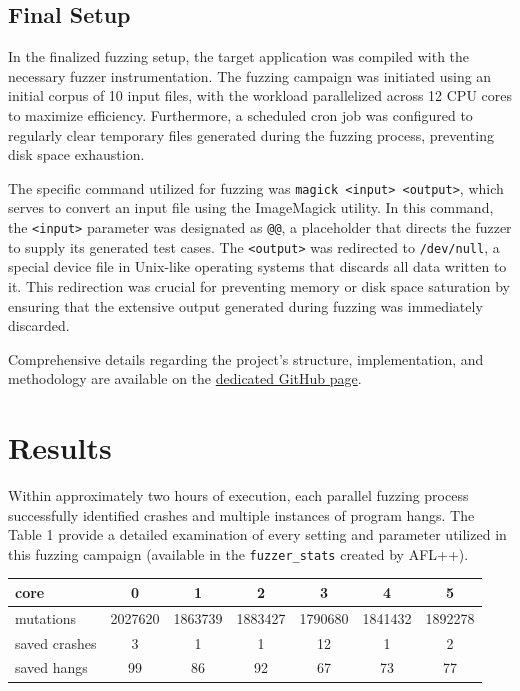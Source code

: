 \documentclass[a4paper,10pt]{article}
\begin{document}
\subsection{Final Setup}

In the finalized fuzzing setup, the target application was compiled with the necessary fuzzer instrumentation. The fuzzing campaign was initiated using an initial corpus of 10 input files, with the workload parallelized across 12 CPU cores to maximize efficiency. Furthermore, a scheduled cron job was configured to regularly clear temporary files generated during the fuzzing process, preventing disk space exhaustion.

The specific command utilized for fuzzing was \verb|magick <input> <output>|, which serves to convert an input file using the ImageMagick utility. In this command, the \verb|<input>| parameter was designated as \verb|@@|, a placeholder that directs the fuzzer to supply its generated test cases. The \verb|<output>| was redirected to \verb|/dev/null|, a special device file in Unix-like operating systems that discards all data written to it. This redirection was crucial for preventing memory or disk space saturation by ensuring that the extensive output generated during fuzzing was immediately discarded.

Comprehensive details regarding the project's structure, implementation, and methodology are available on the  \href{https://github.com/AntoninoRando/SoftwareSecurity}{dedicated GitHub page}.


\section{Results}

Within approximately two hours of execution, each parallel fuzzing process successfully identified crashes and multiple instances of program hangs. The Table 1 provide a detailed examination of every setting and parameter utilized in this fuzzing campaign (available in the \verb|fuzzer_stats| created by AFL++).


\begin{table}
    \centering
    \begin{tabular}{l|cccccc}
    core          & 0       & 1       & 2 & 3 & 4 & 5 \\ \hline
    mutations     & 2027620 & 1863739 & 1883427 & 1790680 & 1841432 & 1892278 \\
    saved crashes & 3       & 1       & 1       & 12      & 1 & 2  \\
    saved hangs   & 99      & 86      & 92      & 67      & 73 & 77 \\
    \end{tabular}
    \label{tab:my_label}
\end{table}
\end{document}
